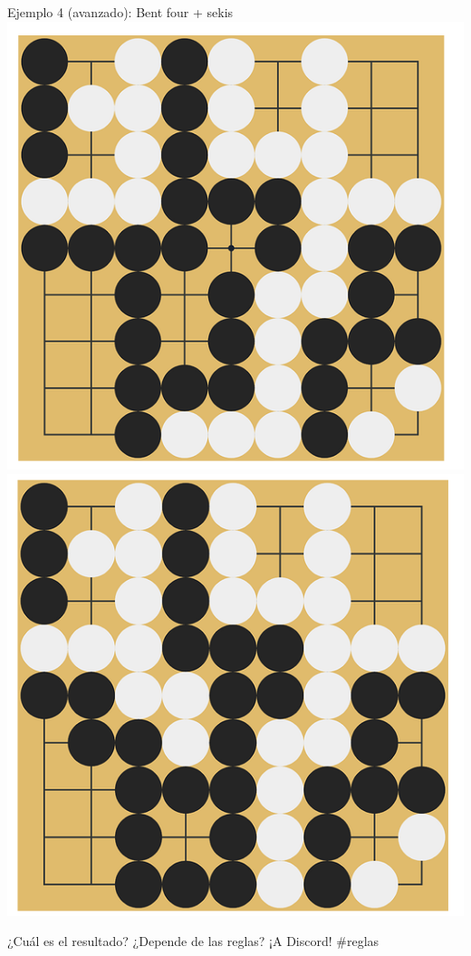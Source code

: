 \documentclass{beamer}
\begin{document}
\begin{frame}{Ejemplo 4 (avanzado): Bent four + sekis}
        \includegraphics[scale=0.3]{tsumego1.png}
        \includegraphics[scale=0.3]{tsumego2.png}
        
        ¿Cuál es el resultado? ¿Depende de las reglas? ¡A Discord! \#reglas
\end{frame}
\end{document}
